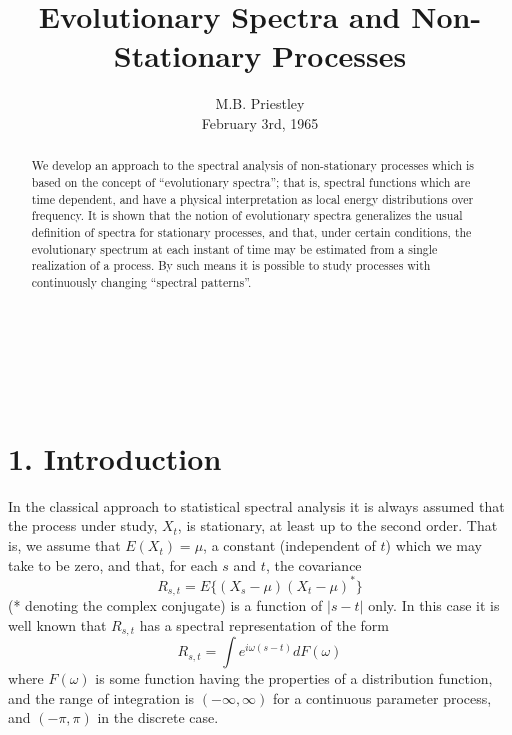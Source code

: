 \documentclass{article}
\newcommand{\tmaffiliation}[1]{\\ #1}
\begin{document}
\title{Evolutionary Spectra and Non-Stationary Processes}

\author{
  M.B. Priestley
  \tmaffiliation{February 3rd, 1965}
}

\maketitle

\begin{abstract}
  We develop an approach to the spectral analysis of non-stationary processes
  which is based on the concept of ``evolutionary spectra''; that is, spectral
  functions which are time dependent, and have a physical interpretation as
  local energy distributions over frequency. It is shown that the notion of
  evolutionary spectra generalizes the usual definition of spectra for
  stationary processes, and that, under certain conditions, the evolutionary
  spectrum at each instant of time may be estimated from a single realization
  of a process. By such means it is possible to study processes with
  continuously changing ``spectral patterns''.
\end{abstract}

\

\

{\tableofcontents}

\section*{1. Introduction}

In the classical approach to statistical spectral analysis it is always
assumed that the process under study, $X_t$, is stationary, at least up to the
second order. That is, we assume that $E (X_t) = \mu$, a constant (independent
of $t$) which we may take to be zero, and that, for each $s$ and $t$, the
covariance
\begin{equation}
  \label{eq:covariance} R_{s, t} = E \{ (X_s - \mu)  (X_t - \mu)^{\ast} \}
\end{equation}
(* denoting the complex conjugate) is a function of $|s - t|$ only. In this
case it is well known that $R_{s, t}$ has a spectral representation of the
form
\begin{equation}
  \label{eq:spectral_rep} R_{s, t} = \int e^{i \omega (s - t)} dF (\omega)
\end{equation}
where $F (\omega)$ is some function having the properties of a distribution
function, and the range of integration is $(- \infty, \infty)$ for a
continuous parameter process, and $(- \pi, \pi)$ in the discrete case.
\end{document}
